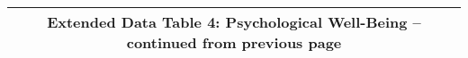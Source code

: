 \begin{longtable}{llcccccccccc}
\multicolumn{12}{c}{{\bfseries Extended Data Table 4: Psychological Well-Being -- continued from previous page}} \\ \hline                                                                                                                                                                                                                                                                                                                                                                                                                                                                                                                                                                                                                                                                                                                                                                                        

\end{longtable}

